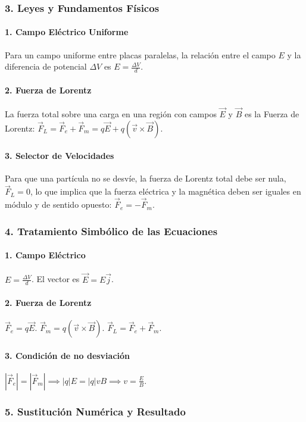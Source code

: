 \subsubsection*{3. Leyes y Fundamentos Físicos}
\paragraph*{1. Campo Eléctrico Uniforme}
Para un campo uniforme entre placas paralelas, la relación entre el campo $E$ y la diferencia de potencial $\Delta V$ es $E = \frac{\Delta V}{d}$.
\paragraph*{2. Fuerza de Lorentz}
La fuerza total sobre una carga en una región con campos $\vec{E}$ y $\vec{B}$ es la Fuerza de Lorentz: $\vec{F}_L = \vec{F}_e + \vec{F}_m = q\vec{E} + q(\vec{v} \times \vec{B})$.
\paragraph*{3. Selector de Velocidades}
Para que una partícula no se desvíe, la fuerza de Lorentz total debe ser nula, $\vec{F}_L = 0$, lo que implica que la fuerza eléctrica y la magnética deben ser iguales en módulo y de sentido opuesto: $\vec{F}_e = -\vec{F}_m$.

\subsubsection*{4. Tratamiento Simbólico de las Ecuaciones}
\paragraph*{1. Campo Eléctrico}
$E = \frac{\Delta V}{d}$. El vector es $\vec{E} = E\vec{j}$.
\paragraph*{2. Fuerza de Lorentz}
$\vec{F}_e = q\vec{E}$.
$\vec{F}_m = q(\vec{v} \times \vec{B})$.
$\vec{F}_L = \vec{F}_e + \vec{F}_m$.
\paragraph*{3. Condición de no desviación}
$|\vec{F}_e| = |\vec{F}_m| \implies |q|E = |q|vB \implies v = \frac{E}{B}$.

\subsubsection*{5. Sustitución Numérica y Resultado}
